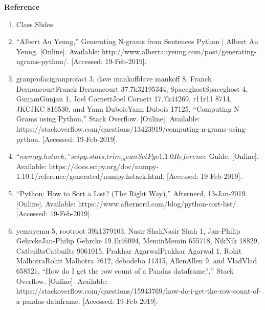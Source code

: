 \documentclass[12pt]{article}
\begin{document}
\textbf{Reference}
\begin{enumerate}

 
\item Class Slides 
\item “Albert Au Yeung,” Generating N-grams from Sentences Python | Albert Au Yeung. [Online]. Available: http://www.albertauyeung.com/post/generating-ngrams-python/. [Accessed: 19-Feb-2019].
\item granprofacigranprofaci 3, dave mankoffdave mankoff 8, Franck DernoncourtFranck Dernoncourt 37.7k32195344, SpaceghostSpaceghost 4, GunjanGunjan 1, Joel CornettJoel Cornett 17.7k44269, r11r11 8714, JKCJKC 816530, and Yann DuboisYann Dubois 17125, “Computing N Grams using Python,” Stack Overflow. [Online]. Available: https://stackoverflow.com/questions/13423919/computing-n-grams-using-python. [Accessed: 19-Feb-2019]. 
\item $“numpy.hstack,” scipy.stats.trim_mean  SciPy v1.1.0 Reference$ Guide. [Online]. Available: https://docs.scipy.org/doc/numpy-1.10.1/reference/generated/numpy.hstack.html. [Accessed: 19-Feb-2019].
 \item  “Python: How to Sort a List? (The Right Way),” Afternerd, 13-Jan-2019. [Online]. Available: https://www.afternerd.com/blog/python-sort-list/. [Accessed: 19-Feb-2019]. 
 
 \item yemuyemu 5, rootroot 39k1379103, Nasir ShahNasir Shah 1, Jan-Philip GehrckeJan-Philip Gehrcke 19.1k46094, MeminMemin 655718, NikNik 18829, CatbuiltsCatbuilts 9061015, Prakhar AgarwalPrakhar Agarwal 1, Rohit MalhotraRohit Malhotra 7612, debodebo 11315, AllenAllen 9, and VladVlad 658521, “How do I get the row count of a Pandas dataframe?,” Stack Overflow. [Online]. Available: https://stackoverflow.com/questions/15943769/how-do-i-get-the-row-count-of-a-pandas-dataframe. [Accessed: 19-Feb-2019].

\end{enumerate}
\end{document}
